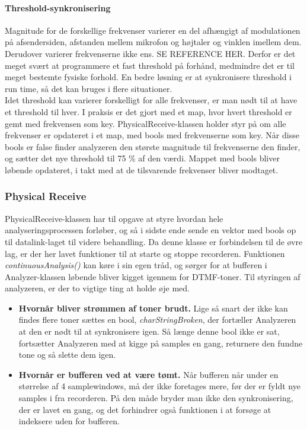 \paragraph{Threshold-synkronisering}

Magnitude for de forskellige frekvenser varierer en del afhængigt af modulationen på afsendersiden, afstanden mellem mikrofon og højtaler og vinklen imellem dem. Derudover varierer frekvenserne ikke ens. SE REFERENCE HER. Derfor er det meget svært at programmere et fast threshold på forhånd, medmindre det er til meget bestemte fysiske forhold. En bedre løsning er at synkronisere threshold i run time, så det kan bruges i flere situationer. \\
Idet threshold kan varierer forskelligt for alle frekvenser, er man nødt til at have et threshold til hver. I praksis er det gjort med et map, hvor hvert threshold er gemt med frekvensen som key. PhysicalReceive-klassen holder styr på om alle frekvenser er opdateret i et map, med bools med frekvenserne som key. Når disse bools er false finder analyzeren den største magnitude til frekvenserne den finder, og sætter det nye threshold til 75 \% af den værdi. Mappet med bools bliver løbende opdateret, i takt med at de tilsvarende frekvenser bliver modtaget. 

\subsubsection{Physical Receive}

PhysicalReceive-klassen har til opgave at styre hvordan hele analyseringsprocessen forløber, og så i sidste ende sende en vektor med bools op til datalink-laget til videre behandling. Da denne klasse er forbindelsen til de øvre lag, er der her lavet funktioner til at starte og stoppe recorderen. Funktionen \textit{continuousAnalysis()} kan køre i sin egen tråd, og sørger for at bufferen i Analyzer-klassen løbende bliver kigget igennem for DTMF-toner. Til styringen af analyzeren, er der to vigtige ting at holde øje med.

\begin{itemize}

\item \textbf{Hvornår bliver strømmen af toner brudt.} Lige så snart der ikke kan findes flere toner sættes en bool, \textit{charStringBroken}, der fortæller Analyzeren at den er nødt til at synkronisere igen. Så længe denne bool ikke er sat, fortsætter Analyzeren med at kigge på samples en gang, returnere den fundne tone og så slette dem igen. 
\item \textbf{Hvornår er bufferen ved at være tømt.} Når bufferen når under en størrelse af 4 samplewindows, må der ikke foretages mere, før der er fyldt nye samples i fra recorderen. På den måde bryder man ikke den synkronisering, der er lavet en gang, og det forhindrer også funktionen i at forsøge at indeksere uden for bufferen.
\end{itemize}

